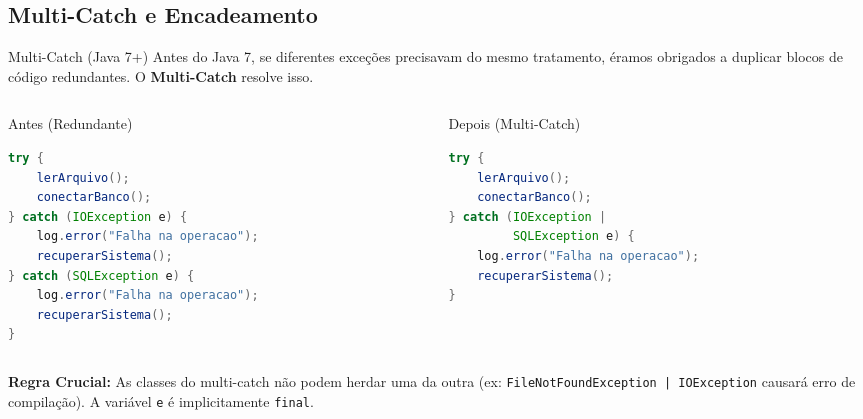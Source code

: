 \documentclass[9pt]{beamer}
\begin{document}
\subsection{Multi-Catch e Encadeamento}
\begin{frame}[fragile]{Multi-Catch (Java 7+)}
    Antes do Java 7, se diferentes exceções precisavam do mesmo tratamento, éramos obrigados a duplicar blocos de código redundantes. O \textbf{Multi-Catch} resolve isso.
    
    \vspace{0.2cm}
    
    \begin{columns}[t]
        \begin{column}{0.48\textwidth}
            \begin{block}{Antes (Redundante)}
                \begin{lstlisting}[language=Java,numbers=none]
try {
    lerArquivo();
    conectarBanco();
} catch (IOException e) {
    log.error("Falha na operacao");
    recuperarSistema();
} catch (SQLException e) {
    log.error("Falha na operacao");
    recuperarSistema();
}
\end{lstlisting}
            \end{block}
        \end{column}
        
        \begin{column}{0.48\textwidth}
            \begin{block}{Depois (Multi-Catch)}
                \begin{lstlisting}[language=Java,numbers=none]
try {
    lerArquivo();
    conectarBanco();
} catch (IOException | 
         SQLException e) {
    log.error("Falha na operacao");
    recuperarSistema();
}
\end{lstlisting}
            \end{block}
        \end{column}
    \end{columns}
    
    \vspace{0.15cm}
    \scriptsize
    \textbf{Regra Crucial:} As classes do multi-catch não podem herdar uma da outra (ex: \texttt{FileNotFoundException | IOException} causará erro de compilação). A variável \texttt{e} é implicitamente \texttt{final}.
\end{frame}
\end{document}
